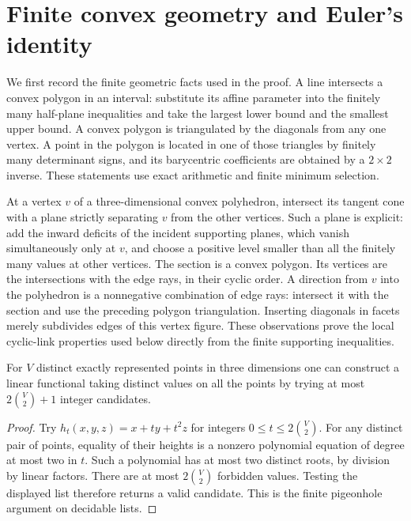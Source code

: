 \section{Finite convex geometry and Euler's identity}\label{sec:euler}

We first record the finite geometric facts used in the proof. A line
intersects a convex polygon in an interval: substitute its affine
parameter into the finitely many half-plane inequalities and take the
largest lower bound and the smallest upper bound. A convex polygon is
triangulated by the diagonals from any one vertex. A point in the polygon
is located in one of those triangles by finitely many determinant signs,
and its barycentric coefficients are obtained by a $2\times2$ inverse.
These statements use exact arithmetic and finite minimum selection.

At a vertex $v$ of a three-dimensional convex polyhedron, intersect its
tangent cone with a plane strictly separating $v$ from the other
vertices. Such a plane is explicit: add the inward deficits of the
incident supporting planes, which vanish simultaneously only at $v$,
and choose a positive level smaller than all the finitely many values
at other vertices. The section is a convex polygon. Its vertices are
the intersections with the edge rays, in their cyclic order. A direction
from $v$ into the polyhedron is a nonnegative combination of edge rays:
intersect it with the section and use the preceding polygon triangulation.
Inserting diagonals in facets merely subdivides edges of this vertex
figure. These observations prove the local cyclic-link properties used
below directly from the finite supporting inequalities.

\begin{lemma}\label{lem:height}
For $V$ distinct exactly represented points in three dimensions one can
construct a linear functional taking distinct values on all the points
by trying at most $2\binom V2+1$ integer candidates.
\end{lemma}
\begin{proof}
Try $h_t(x,y,z)=x+ty+t^2z$ for integers
$0\leq t\leq2\binom V2$. For any distinct pair of points, equality of
their heights is a nonzero polynomial equation of degree at most two
in $t$. Such a polynomial has at most two distinct roots, by division
by linear factors. There are at most $2\binom V2$ forbidden values.
Testing the displayed list therefore returns a valid candidate.
This is the finite pigeonhole argument on decidable lists.
\end{proof}

